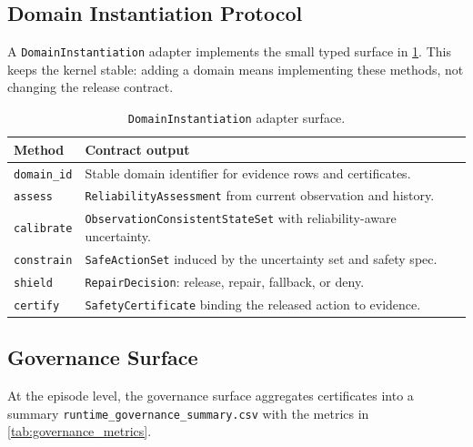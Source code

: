 \subsection{Domain Instantiation Protocol}

A \texttt{DomainInstantiation} adapter implements the small typed surface in
\cref{tab:domain_protocol_methods}.  This keeps the kernel stable: adding a
domain means implementing these methods, not changing the release contract.

\begin{table}[t]
\caption{\texttt{DomainInstantiation} adapter surface.}
\label{tab:domain_protocol_methods}
\centering\footnotesize
\begin{tabularx}{\linewidth}{lX}
\toprule
\textbf{Method} & \textbf{Contract output} \\
\midrule
\texttt{domain\_id} & Stable domain identifier for evidence rows and certificates. \\
\texttt{assess} & \texttt{ReliabilityAssessment} from current observation and history. \\
\texttt{calibrate} & \texttt{ObservationConsistentStateSet} with reliability-aware uncertainty. \\
\texttt{constrain} & \texttt{SafeActionSet} induced by the uncertainty set and safety spec. \\
\texttt{shield} & \texttt{RepairDecision}: release, repair, fallback, or deny. \\
\texttt{certify} & \texttt{SafetyCertificate} binding the released action to evidence. \\
\bottomrule
\end{tabularx}
\end{table}

\subsection{Governance Surface}\label{sec:governance_surface}

At the episode level, the governance surface aggregates certificates into a summary
\texttt{runtime\_governance\_summary.csv} with the metrics in
\cref{tab:governance_metrics}.

